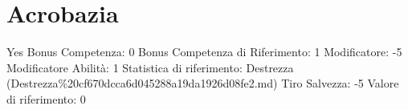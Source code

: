 \section{Acrobazia}\label{acrobazia}

\begin{description}
\tightlist
\item[Tags: ABI]
Yes Bonus Competenza: 0 Bonus Competenza di Riferimento: 1 Modificatore:
-5 Modificatore Abilità: 1 Statistica di riferimento: Destrezza
(Destrezza\%20cf670dcca6d045288a19da1926d08fe2.md) Tiro Salvezza: -5
Valore di riferimento: 0
\end{description}
